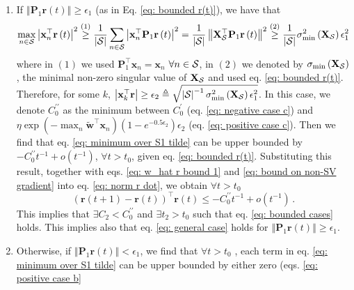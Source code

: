 \documentclass[twoside,11pt,english]{article}
\begin{document}
\begin{enumerate}
\item If $\left\Vert \mathbf{P}_{1}\mathbf{r}\left(t\right)\right\Vert \geq\epsilon_{1}$
(as in Eq. \ref{eq: bounded r(t)}), we have that 
\begin{equation}
\max_{n\in\mathcal{S}}\left|\mathbf{x}_{n}^{\top}\mathbf{r}\left(t\right)\right|^{2}\overset{\left(1\right)}{\geq}\frac{1}{\left|\mathcal{S}\right|}\sum_{n\in\mathcal{S}}\left|\mathbf{x}_{n}^{\top}\mathbf{P}_{1}\mathbf{r}\left(t\right)\right|^{2}=\frac{1}{\left|\mathcal{S}\right|}\left\Vert \mathbf{X}_{\mathcal{S}}^{\top}\mathbf{P}_{1}\mathbf{r}\left(t\right)\right\Vert ^{2}\overset{\left(2\right)}{\geq}\frac{1}{\left|\mathcal{S}\right|}\sigma_{\min}^{2}\left(\mathbf{X}_{\mathcal{S}}\right)\epsilon_{1}^{2}\label{eq: epsilon 2}
\end{equation}
where in $\left(1\right)$ we used $\mathbf{P}_{1}^{\top}\mathbf{x}_{n}=\mathbf{x}_{n}$
$\forall n\in\mathcal{S}$, in $\left(2\right)$ we denoted by $\sigma_{\min}\left(\mathbf{X}_{\mathcal{S}}\right)$,
the minimal non-zero singular value of $\mathbf{X}_{\mathcal{S}}$ and used
eq. \ref{eq: bounded r(t)}. Therefore, for some $k$, $\left|\mathbf{x}_{k}^{\top}\mathbf{r}\right|\geq\epsilon_{2}\triangleq\sqrt{\left|\mathcal{S}\right|^{-1}\sigma_{\min}^{2}\left(\mathbf{X}_{\mathcal{S}}\right)\epsilon_{1}^{2}}$.
In this case, we denote $C_{0}^{\prime\prime}$ as the minimum between
$C_{0}^{\prime}$ (eq. \ref{eq: negative case c}) and $\eta\exp\left(-\max_{n}\tilde{\mathbf{w}}^{\top}\mathbf{x}_{n}\right)\left(1-e^{-0.5\epsilon_{2}}\right)\epsilon_{2}$
(eq. \ref{eq: positive case c}). Then we find that eq. \ref{eq: minimum over S1 tilde}
can be upper bounded by $-C_{0}^{\prime\prime}t^{-1}+o\left(t^{-1}\right)$,
$\forall t>t_{0}$, given eq. \ref{eq: bounded r(t)}. Substituting
this result, together with eqs. \ref{eq: w_hat r bound 1} and \ref{eq: bound on non-SV gradient}
into eq. \ref{eq: norm r dot}, we obtain $\forall t>t_{0}$ 
\[
\left(\mathbf{r}\left(t+1\right)-\mathbf{r}\left(t\right)\right)^{\top}\mathbf{r}\left(t\right)\leq-C_{0}^{\prime\prime}t^{-1}+o\left(t^{-1}\right)\,.
\]
This implies that $\exists C_{2}<C_{0}^{\prime\prime}$ and $\exists t_{2}>t_{0}$
such that eq. \ref{eq: bounded cases} holds. This implies also that
eq. \ref{eq: general case} holds for $\left\Vert \mathbf{P}_{1}\mathbf{r}\left(t\right)\right\Vert \geq\epsilon_{1}$. 
\item Otherwise, if $\left\Vert \mathbf{P}_{1}\mathbf{r}\left(t\right)\right\Vert <\epsilon_{1}$,
we find that $\forall t>t_{0}$ , each term in eq. \ref{eq: minimum over S1 tilde}
can be upper bounded by either zero (eqs. \ref{eq: positive case b}

\end{enumerate}
\end{document}
